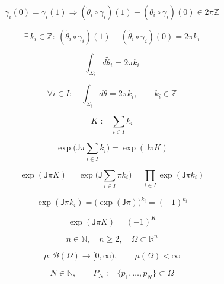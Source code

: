 \documentclass[12pt]{article}
\begin{document}
\begin{equation}
\gamma_i(0)=\gamma_i(1)
\Longrightarrow
(\widetilde{\theta}_i\circ\gamma_i)(1)-(\widetilde{\theta}_i\circ\gamma_i)(0)\in 2\pi\mathbb{Z}
\end{equation}

\begin{equation}
\exists\,k_i\in\mathbb{Z}:\ 
(\widetilde{\theta}_i\circ\gamma_i)(1)-(\widetilde{\theta}_i\circ\gamma_i)(0)=2\pi k_i
\end{equation}

\begin{equation}
\boxed{
\int_{\Sigma_i}d\widetilde{\theta}_i=2\pi k_i
}
\end{equation}

\begin{equation}
\forall i\in I:\quad \int_{\Sigma_i} d\theta = 2\pi k_i,\qquad k_i\in\mathbb{Z}
\end{equation}

\begin{equation}
K:=\sum_{i\in I}k_i
\end{equation}

\begin{equation}
\exp\!\Big(\mathsf{J}\pi\sum_{i\in I}k_i\Big)=\exp(\mathsf{J}\pi K)
\end{equation}

\begin{equation}
\exp(\mathsf{J}\pi K)=\exp\!\Big(\mathsf{J}\sum_{i\in I}\pi k_i\Big)=\prod_{i\in I}\exp(\mathsf{J}\pi k_i)
\end{equation}

\begin{equation}
\exp(\mathsf{J}\pi k_i)=\big(\exp(\mathsf{J}\pi)\big)^{k_i}=(-1)^{k_i}
\end{equation}

\begin{equation}
\exp(\mathsf{J}\pi K)=(-1)^K
\end{equation}

\begin{equation}
n\in\mathbb{N},\quad n\ge 2,\quad \Omega\subset\mathbb{R}^n
\end{equation}

\begin{equation}
\mu:\mathcal{B}(\Omega)\to[0,\infty),\qquad \mu(\Omega)<\infty
\end{equation}

\begin{equation}
N\in\mathbb{N},\qquad P_N:=\{p_1,\dots,p_N\}\subset\Omega
\end{equation}
\end{document}
